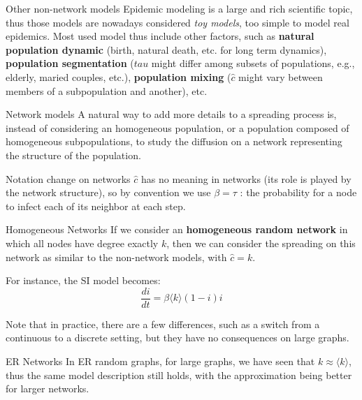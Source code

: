 
\begin{textbox}{Other non-network models}
    Epidemic modeling is a large and rich scientific topic, thus those models are nowadays considered \textit{toy models}, too simple to model real epidemics. Most used model thus include other factors, such as \textbf{natural population dynamic} (birth, natural death, etc. for long term dynamics), \textbf{population segmentation} ($tau$ might differ among subsets of populations, e.g., elderly, maried couples, etc.), \textbf{population mixing} ($\hat{c}$ might vary between members of a subpopulation and another), etc.
\end{textbox}

\begin{textbox}{Network models}
    A natural way to add more details to a spreading process is, instead of considering an homogeneous population, or a population composed of homogeneous subpopulations, to study the diffusion on a network representing the structure of the population.
\end{textbox}


\begin{textbox}{Notation change on networks}
    $\hat{c}$ has no meaning in networks (its role is played by the network structure), so by convention we use $\beta=\tau$ : the probability for a node to infect each of its neighbor at each step.
\end{textbox}

\begin{textbox}{Homogeneous Networks}
    If we consider an \textbf{homogeneous random network} in which all nodes have degree exactly $k$, then we can consider the spreading on this network as similar to the non-network models, with $\hat{c}=k$.

    For instance, the SI model becomes:
    \[
        \frac{di}{dt}=\beta \langle k \rangle (1-i)i
    \]

    Note that in practice, there are a few differences, such as a switch from a continuous to a discrete setting, but they have no consequences on large graphs.
\end{textbox}

\begin{textbox}{ER Networks}
    In ER random graphs, for large graphs, we have seen that $k\approx \langle k \rangle$, thus the same model description still holds, with the approximation being better for larger networks.
\end{textbox}

